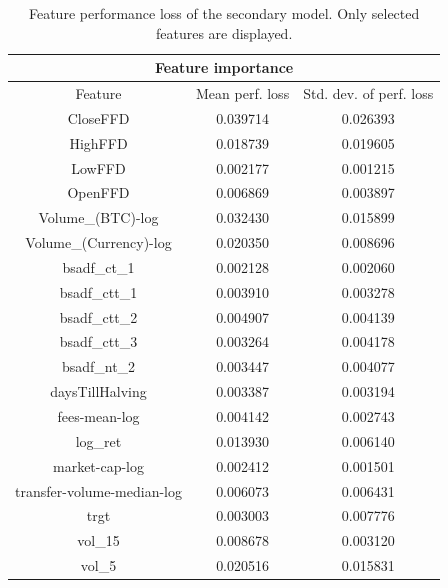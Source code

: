 \begin{table}[H]
  \centering
  \begin{tabular}{| c | c | c |} 
    \hline
    \multicolumn{3}{|c|}{Feature importance} \\
    \hline
    Feature                     & Mean perf. loss & Std. dev. of perf. loss\\ \hline
    CloseFFD                    & 0.039714        & 0.026393 \\ \hline
    HighFFD                     & 0.018739        & 0.019605 \\ \hline
    LowFFD                      & 0.002177        & 0.001215 \\ \hline
    OpenFFD                     & 0.006869        & 0.003897 \\ \hline
    Volume\_(BTC)-log            & 0.032430        & 0.015899 \\ \hline
    Volume\_(Currency)-log       & 0.020350        & 0.008696 \\ \hline
    bsadf\_ct\_1                  & 0.002128        & 0.002060 \\ \hline
    bsadf\_ctt\_1                 & 0.003910        & 0.003278 \\ \hline
    bsadf\_ctt\_2                 & 0.004907        & 0.004139 \\ \hline
    bsadf\_ctt\_3                 & 0.003264        & 0.004178 \\ \hline
    bsadf\_nt\_2                  & 0.003447        & 0.004077 \\ \hline
    daysTillHalving             & 0.003387        & 0.003194 \\ \hline
    fees-mean-log               & 0.004142        & 0.002743 \\ \hline
    log\_ret                     & 0.013930        & 0.006140 \\ \hline
    market-cap-log              & 0.002412        & 0.001501 \\ \hline
    transfer-volume-median-log  & 0.006073        & 0.006431 \\ \hline
    trgt                        & 0.003003        & 0.007776 \\ \hline
    vol\_15                      & 0.008678        & 0.003120 \\ \hline
    vol\_5                       & 0.020516        & 0.015831 \\ \hline
  \end{tabular}
  \caption{Feature performance loss of the secondary model. Only selected features are displayed.}
  \label{table:feature_importance_results}
\end{table}

